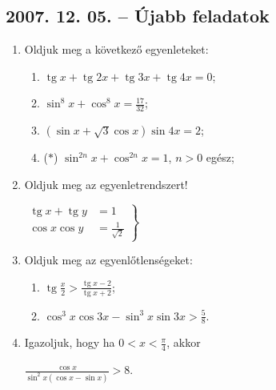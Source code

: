 \documentclass{article}
\newenvironment{abc}{\begin{enumerate}[label=\textit{\alph*})]}{\end{enumerate}}
\newcommand{\tg}{\mathop{\mathrm{tg}}\nolimits}
\begin{document}
\subsection*{2007. 12. 05. -- Újabb feladatok}
\begin{enumerate}
\item Oldjuk meg a következő egyenleteket:
\begin{abc}
\item $\tg x+\tg 2x+\tg 3x+\tg 4x=0$;
\item $\sin^8x+\cos^8x=\frac{17}{32}$;
\item $\left(\sin x+\sqrt{3}\cos x\right)\sin 4x=2$;
\item ($*$) $\sin^{2n}x+\cos^{2n}x=1$, $n>0$ egész;
\end{abc}
\item Oldjuk meg az egyenletrendszert!

$\left.
\begin{aligned}
\tg x+\tg y&=1\\
\cos x\cos y&=\frac{1}{\sqrt{2}}
\end{aligned}
\right\}$
\item Oldjuk meg az egyenlőtlenségeket:
\begin{abc}
\item $\displaystyle{\tg \frac{x}{2}>\frac{\tg x-2}{\tg x+2}}$;
\item $\displaystyle{\cos^3x\cos 3x-\sin^3x\sin 3x>\frac{5}{8}}$.
\end{abc}
\item Igazoljuk, hogy ha $0<x<\frac{\pi}{4}$, akkor

$\displaystyle{\frac{\cos x}{\sin^2x(\cos x-\sin x)}>8}$.
\end{enumerate}
\end{document}

